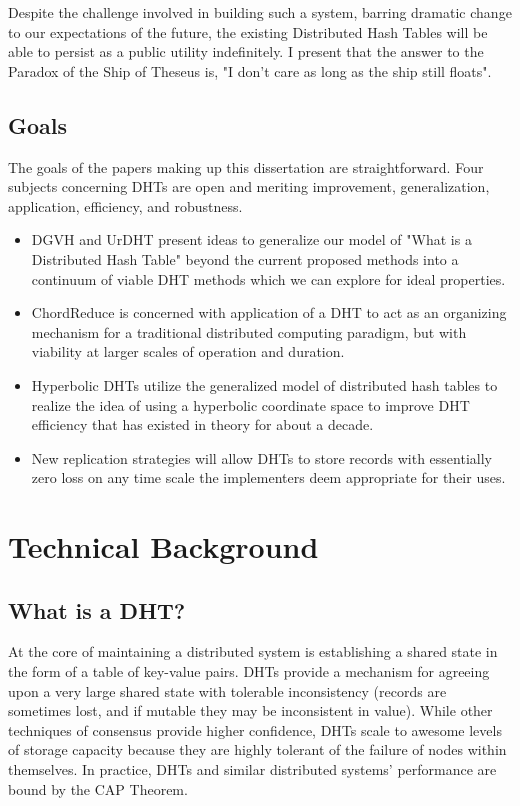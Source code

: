 Despite the challenge involved in building such a system, barring dramatic change to our expectations of the future, the existing Distributed Hash Tables will be able to persist as a public utility indefinitely.
I present that the answer to the Paradox of the Ship of Theseus is, "I don't care as long as the ship still floats".

\section{Goals}

The goals of the papers making up this dissertation are straightforward.
Four subjects concerning DHTs are open and meriting improvement, generalization, application, efficiency, and robustness. 
\begin{itemize}

\item DGVH and UrDHT present ideas to generalize our model of "What is a Distributed Hash Table" beyond the current proposed methods into a continuum of viable DHT methods which we can explore for ideal properties. 

\item ChordReduce is concerned with application of a DHT to act as an organizing mechanism for a traditional distributed computing paradigm, but with viability at larger scales of operation and duration.

\item Hyperbolic DHTs utilize the generalized model of distributed hash tables to realize the idea of using a hyperbolic coordinate space to improve DHT efficiency that has existed in theory for about a decade.

\item New replication strategies will allow DHTs to store records with essentially zero loss on any time scale the implementers deem appropriate for their uses. 


\end{itemize}



\chapter{Technical Background}
\section{What is a DHT?}
At the core of maintaining a distributed system is establishing a shared state in the form of a table of key-value pairs.
DHTs provide a mechanism for agreeing upon a very large shared state with tolerable inconsistency (records are sometimes lost, and if mutable they may be inconsistent in value).
While other techniques of consensus provide higher confidence, DHTs scale to awesome levels of storage capacity because they are highly tolerant of the failure of nodes within themselves.
In practice, DHTs and similar distributed systems' performance are bound by the CAP Theorem\cite{brewer2010certain}.

